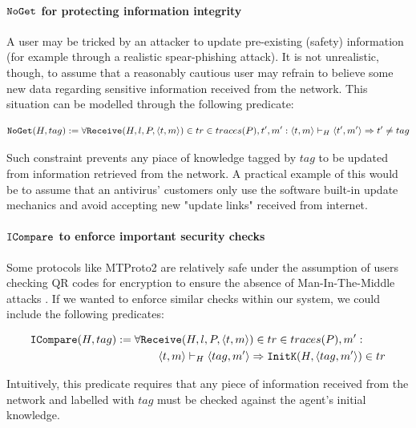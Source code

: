 \documentclass{article}
\newcommand{\mono}[1]{\textrm{\tt #1}}
\begin{document}
\paragraph{$\mono{NoGet}$ for protecting information integrity}

A user may be tricked by an attacker to update pre-existing (safety) information (for example through a realistic spear-phishing attack). It is not unrealistic, though, to assume that a reasonably cautious user may refrain to believe some new data regarding sensitive information received from the network. This situation can be modelled through the following predicate:

\begin{equation*}
    \mono{NoGet}(H,tag) := \forall \mono{Receive}(H,l,P,\langle t,m \rangle) \in tr \in traces(P), t', m' : \langle t, m \rangle \vdash_H \langle t', m' \rangle \Rightarrow t' \not = tag
\end{equation*}

Such constraint prevents any piace of knowledge tagged by $tag$ to be updated from information retrieved from the network. A practical example of this would be to assume that an antivirus' customers only use the software built-in update mechanics and avoid accepting new "update links" received from internet.

\paragraph{$\mono{ICompare}$ to enforce important security checks}

Some protocols like MTProto2 are relatively safe under the assumption of users checking QR codes for encryption to ensure the absence of Man-In-The-Middle attacks \cite{Miculan_2023}. If we wanted to enforce similar checks within our system, we could include the following predicates:

\begin{align*}
    \mono{ICompare}(H,tag) := \forall \mono{Rec}&\mono{eive}(H,l,P,\langle t,m \rangle) \in tr \in traces(P), m' : \\
    &\langle t,m \rangle \vdash_H \langle tag,m' \rangle \Rightarrow \mono{InitK}(H, \langle tag,m' \rangle) \in tr
\end{align*}

Intuitively, this predicate requires that any piece of information received from the network and labelled with $tag$ must be checked against the agent's initial knowledge.
\end{document}
